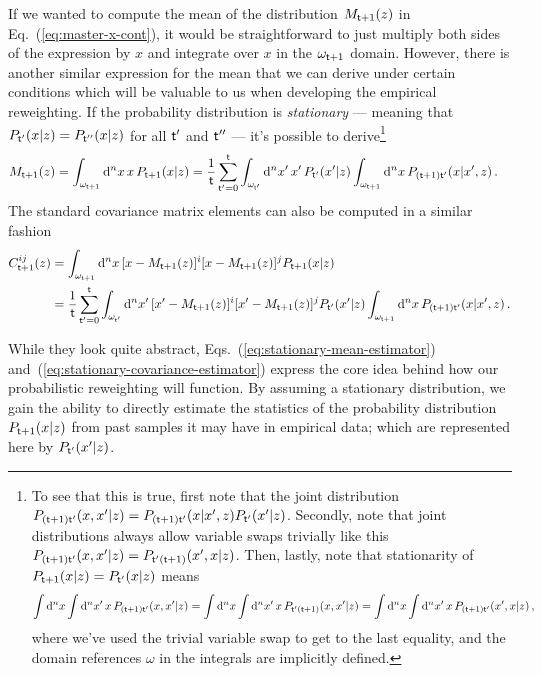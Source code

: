 If we wanted to compute the mean of the distribution $M_{{\sf t}+1}(z)$ in Eq.~(\ref{eq:master-x-cont}), it would be straightforward to just multiply both sides of the expression by $x$ and integrate over $x$ in the $\omega_{{\sf t}+1}$ domain. However, there is another similar expression for the mean that we can derive under certain conditions which will be valuable to us when developing the empirical reweighting. If the probability distribution is \emph{stationary} --- meaning that $P_{{\sf t}'}(x\vert z)=P_{{\sf t}''}(x\vert z)$ for all ${\sf t}'$ and ${\sf t}''$ --- it's possible to derive\footnote{To see that this is true, first note that the joint distribution $P_{({\sf t}+1){\sf t}'}(x,x'\vert z)=P_{({\sf t}+1){\sf t}'}(x\vert x',z)P_{{\sf t}'}(x'\vert z)$. Secondly, note that joint distributions always allow variable swaps trivially like this $P_{({\sf t}+1){\sf t}'}(x,x'\vert z)=P_{{\sf t}'({\sf t}+1)}(x',x\vert z)$. Then, lastly, note that stationarity of $P_{{\sf t}+1}(x\vert z)=P_{{\sf t}'}(x\vert z)$ means 
$$\int {\rm d}^nx\int {\rm d}^nx' \, x\,P_{({\sf t}+1){\sf t}'}(x,x'\vert z)=\int {\rm d}^nx\int {\rm d}^nx'  \, x\, P_{{\sf t}'({\sf t}+1)}(x,x'\vert z)=\int {\rm d}^nx\int {\rm d}^nx'  \, x\, P_{({\sf t}+1){\sf t}'}(x',x\vert z)\,,$$
where we've used the trivial variable swap to get to the last equality, and the domain references $\omega$ in the integrals are implicitly defined.} 
\begin{align}
M_{{\sf t}+1}(z) = \int_{\omega_{{\sf t}+1}}{\rm d}^nx \,x\,P_{{\sf t}+1}(x\vert z) &= \frac{1}{{\sf t}}\sum_{{\sf t}'=0}^{{\sf t}}\int_{\omega_{{\sf t}'}}{\rm d}^nx' \, x' \, P_{{\sf t}'}(x'\vert z) \int_{\omega_{{\sf t}+1}}{\rm d}^nx \, P_{({\sf t}+1){\sf t}'}(x\vert x',z) \label{eq:stationary-mean-estimator}\,.
\end{align}
The standard covariance matrix elements can also be computed in a similar fashion
\begin{align}
C^{ij}_{{\sf t}+1}(z) &= \int_{\omega_{{\sf t}+1}}{\rm d}^nx \,[x-M_{{\sf t}+1}(z)
]^i[x-M_{{\sf t}+1}(z)]^jP_{{\sf t}+1}(x\vert z) \nonumber \\
&= \frac{1}{{\sf t}}\sum_{{\sf t}'=0}^{{\sf t}}\int_{\omega_{{\sf t}'}}{\rm d}^nx' \, [x'-M_{{\sf t}+1}(z)]^i[x'-M_{{\sf t}+1}(z)]^j P_{{\sf t}'}(x'\vert z) \int_{\omega_{{\sf t}+1}}{\rm d}^nx \, P_{({\sf t}+1){\sf t}'}(x\vert x',z) \label{eq:stationary-covariance-estimator}\,.
\end{align}

While they look quite abstract, Eqs.~(\ref{eq:stationary-mean-estimator}) and~(\ref{eq:stationary-covariance-estimator}) express the core idea behind how our probabilistic reweighting will function. By assuming a stationary distribution, we gain the ability to directly estimate the statistics of the probability distribution $P_{{\sf t}+1}(x\vert z)$ from past samples it may have in empirical data; which are represented here by $P_{{\sf t}'}(x'\vert z)$.

